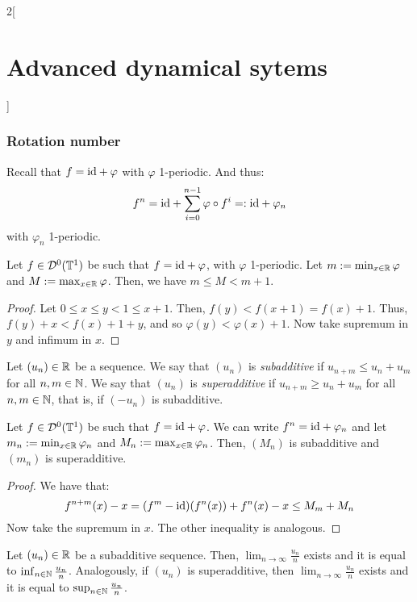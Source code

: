 \documentclass[../../../main_math.tex]{subfiles}
\begin{document}
\begin{multicols}{2}[\section{Advanced dynamical sytems}]
  \subsubsection{Rotation number}\label{ADS:rotation_number_section}
  \begin{remark}
    Recall that $f=\mathrm{id}+\varphi$ with $\varphi$ 1-periodic. And thus:
    $$
      f^n=\mathrm{id} + \sum_{i=0}^{n-1} \varphi\circ f^i=: \mathrm{id} + \varphi_n
    $$
    with $\varphi_n$ 1-periodic.
  \end{remark}
  \begin{lemma}\label{ADS:lema1}
    Let $f\in \mathcal{D}^0(\mathbb{T}^1)$ be such that $f=\mathrm{id} +\varphi$, with $\varphi$ 1-periodic. Let $m:=\min_{x\in\mathbb{R}}\varphi$ and $M:=\max_{x\in\mathbb{R}}\varphi$. Then, we have $m\leq M< m+1$.
  \end{lemma}
  \begin{proof}
    Let $0\leq x\leq y<1\leq x+1$. Then, $f(y)<f(x+1)=f(x)+1$. Thus, $f(y)+x< f(x)+1+y$, and so $\varphi(y) < \varphi(x)+1$. Now take supremum in $y$ and infimum in $x$.
  \end{proof}
  \begin{definition}
    Let ${(u_n)}\in\mathbb{R}$ be a sequence. We say that $(u_n)$ is \emph{subadditive} if $u_{n+m}\leq u_n+u_m$ for all $n,m\in\mathbb{N}$. We say that $(u_n)$ is \emph{superadditive} if $u_{n+m}\geq u_n+u_m$ for all $n,m\in\mathbb{N}$, that is, if $(-u_n)$ is subadditive.
  \end{definition}
  \begin{lemma}\label{ADS:lema2}
    Let $f\in \mathcal{D}^0(\mathbb{T}^1)$ be such that $f=\mathrm{id} +\varphi$. We can write $f^n=\mathrm{id} +\varphi_n$ and let $m_n:=\min_{x\in\mathbb{R}}\varphi_n$ and $M_n:=\max_{x\in\mathbb{R}}\varphi_n$. Then, $(M_n)$ is subadditive and $(m_n)$ is superadditive.
  \end{lemma}
  \begin{proof}
    We have that:
    \begin{equation*}
      f^{n+m}(x)-x=(f^m-\mathrm{id})(f^n(x))+f^n(x)-x\leq M_m+M_n
    \end{equation*}
    Now take the supremum in $x$. The other inequality is analogous.
  \end{proof}
  \begin{lemma}\label{ADS:lema3}
    Let $(u_n)\in\mathbb{R}$ be a subadditive sequence. Then, $\displaystyle\lim_{n\to\infty}\frac{u_n}{n}$ exists and it is equal to $\inf_{n\in\mathbb{N}}\frac{u_n}{n}$. Analogously, if $(u_n)$ is superadditive, then $\displaystyle\lim_{n\to\infty}\frac{u_n}{n}$ exists and it is equal to $\sup_{n\in\mathbb{N}}\frac{u_n}{n}$.

\end{lemma}
\end{multicols}
\end{document}

